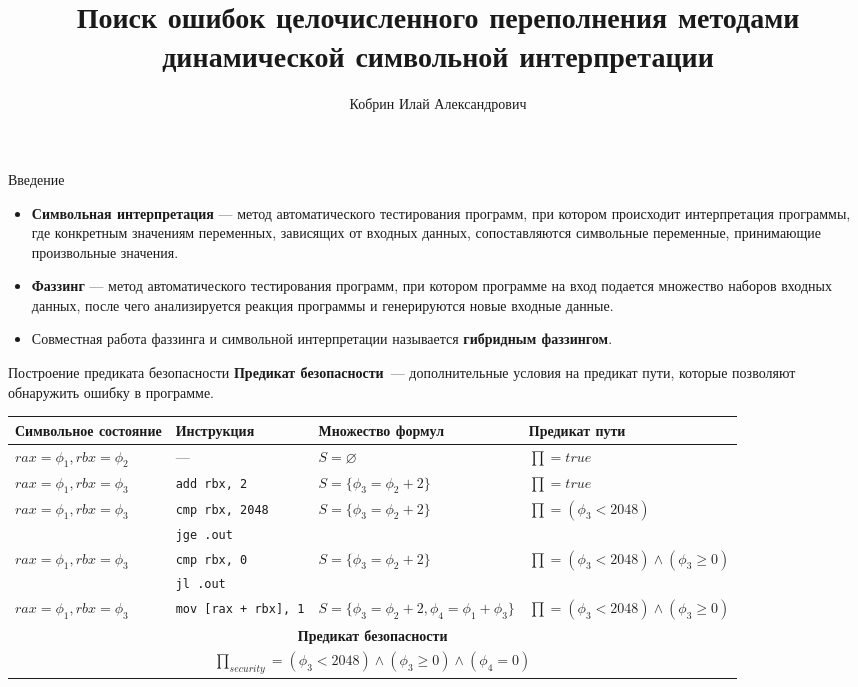 \documentclass[10pt]{beamer}
\title{Поиск ошибок целочисленного переполнения методами динамической символьной
интерпретации}
\author{Кобрин Илай Александрович}
\institute{МГУ им. М.В. Ломоносова, кафедра системного программирования}
\begin{document}
\maketitle

\begin{frame}{Введение}
\begin{itemize}
    \item \textbf{Символьная интерпретация} --- метод автоматического тестирования
        программ, при котором происходит интерпретация программы, где конкретным
        значениям переменных, зависящих от входных данных, сопоставляются
        символьные переменные, принимающие произвольные значения.
    \item \textbf{Фаззинг} --- метод автоматического тестирования программ, при котором
        программе на вход подается множество наборов входных данных, после чего
        анализируется реакция программы и генерируются новые входные данные.
    \item Совместная работа фаззинга и символьной интерпретации называется
        \textbf{гибридным фаззингом}.
\end{itemize}
\end{frame}

\begin{frame}{Построение предиката безопасности}
\textbf{Предикат безопасности}~--- дополнительные условия на предикат пути,
которые позволяют обнаружить ошибку в программе.

\begin{center}
\tiny
\begin{tabular}{ l  l  l  l }\toprule
\textbf{Символьное состояние} & \textbf{Инструкция} & \textbf{Множество формул} & \textbf{Предикат пути} \\
\hline
$rax = \phi_1, rbx = \phi_2$ & --- & $S = \varnothing$ & $\prod = true$ \\
\hline
$rax = \phi_1, rbx = \phi_3$ & \texttt{add rbx, 2} & $S = \{\phi_3 = \phi_2 +
2\}$ & $\prod = true$ \\
\hline
\multirow{2}{*}{$rax = \phi_1, rbx = \phi_3$} & \texttt{cmp rbx, 2048} & \multirow{2}{*}{$S =
\{\phi_3 = \phi_2 + 2\}$} & \multirow{2}{*}{$\prod = (\phi_3 < 2048)$} \\
& \texttt{jge .out} &&\\
\hline
\multirow{2}{*}{$rax = \phi_1, rbx = \phi_3$} & \texttt{cmp rbx, 0} & \multirow{2}{*}{$S =
\{\phi_3 = \phi_2 + 2\}$} & \multirow{2}{*}{$\prod = (\phi_3 < 2048) \land
(\phi_3 \geq 0)$} \\
& \texttt{jl .out} &&\\
\hline
$rax = \phi_1, rbx = \phi_3$ & \texttt{mov [rax + rbx], 1} &
$S = \{\phi_3 = \phi_2 + 2, \phi_4 = \phi_1 + \phi_3\}$ & $\prod = (\phi_3 < 2048) \land (\phi_3 \geq 0)$ \\
\midrule
\multicolumn{4}{c}{\textbf{Предикат безопасности}} \\
\multicolumn{4}{c}{$\prod_{security} = (\phi_3 < 2048) \land (\phi_3 \geq 0)
\land (\phi_4 = 0)$} \\
\bottomrule
\end{tabular}
\end{center}
\end{frame}
\end{document}
